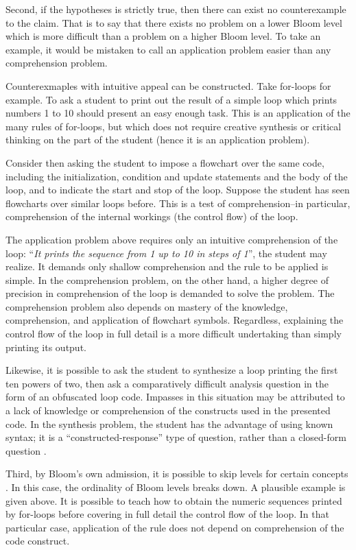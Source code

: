 Second, if the hypotheses is strictly true, then there can exist no
counterexample to the claim.  That is to say that there exists no problem on a
lower Bloom level which is more difficult than a problem on a higher Bloom
level.  To take an example, it would be mistaken to call an application problem
easier than any comprehension problem. 

Counterexmaples with intuitive appeal can be constructed.  Take for-loops for
example.  To ask a student to print out the result of a simple loop which
prints numbers 1 to 10 should present an easy enough task.  This is an
application of the many rules of for-loops, but which does not require creative
synthesis or critical thinking on the part of the student (hence it is an
application problem). 

Consider then asking the student to impose a flowchart over the same code,
including the initialization, condition and update statements and the body of
the loop, and to indicate the start and stop of the loop.  Suppose the student
has seen flowcharts over similar loops before.  This is a test of
comprehension--in particular, comprehension of the internal workings (the
control flow) of the loop.    

The application problem above requires only an intuitive comprehension of the
loop: ``\emph{It prints the sequence from 1 up to 10 in steps of 1}'', the
student may realize.  It demands only shallow comprehension and the rule to be
applied is simple.  In the comprehension problem, on the other hand, a higher
degree of precision in comprehension of the loop is demanded to solve the
problem.  The comprehension problem also depends on mastery of the knowledge,
comprehension, and application of flowchart symbols.  Regardless, explaining
the control flow of the loop in full detail is a more difficult undertaking
than simply printing its output. 

Likewise, it is possible to ask the student to synthesize a loop printing the
first ten powers of two, then ask a comparatively difficult analysis question
in the form of an obfuscated loop code.  Impasses in this situation may be
attributed to a lack of knowledge or comprehension of the constructs used in
the presented code.  In the synthesis problem, the student has the advantage of
using known syntax; it is a ``constructed-response'' type of question, rather
than a closed-form question \cite{kuechler2010performance}. 

Third, by Bloom's own admission, it is possible to skip levels for certain
concepts \cite{bloom1956}.  In this case, the ordinality of Bloom levels
breaks down.  A plausible example is given above.  It is possible to teach how
to obtain the numeric sequences printed by for-loops before covering in full
detail the control flow of the loop.  In that particular case, application of
the rule does not depend on comprehension of the code construct.


